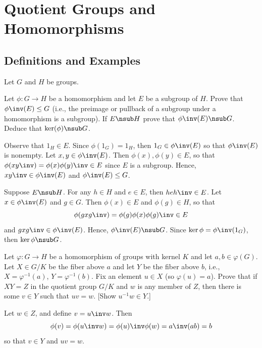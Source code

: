 \section{Quotient Groups and Homomorphisms}

\subsection{Definitions and Examples}

Let $G$ and $H$ be groups.

\begin{exercise}\label{ex3.1.1}
    Let $\phi : G \to H$ be a homomorphism and let $E$ be a subgroup of $H$. Prove that $\phi\inv(E) \leq G$ (i.e., the preimage or pullback of a subgroup under a homomorphism is a subgroup). If $E \nsub H$ prove that $\phi\inv(E) \nsub G$. Deduce that $\ker(\phi) \nsub G$.
\end{exercise}

\begin{sol}
    Observe that $1_H \in E$. Since $\phi(1_G) = 1_H$, then $1_G \in \phi\inv(E)$ so that $\phi\inv(E)$ is nonempty. Let $x, y \in \phi\inv(E)$. Then $\phi(x), \phi(y) \in E$, so that $\phi(xy\inv) = \phi(x)\phi(y)\inv \in E$ since $E$ is a subgroup. Hence, $xy\inv \in \phi\inv(E)$ and $\phi\inv(E) \leq G$.

    Suppose $E \nsub H$. For any $h \in H$ and $e \in E$, then $heh\inv \in E$. Let $x \in \phi\inv(E)$ and $g \in G$. Then $\phi(x) \in E$ and $\phi(g) \in H$, so that
    \[\phi(gxg\inv) = \phi(g)\phi(x)\phi(g)\inv \in E\]
    and $gxg\inv \in \phi\inv(E)$. Hence, $\phi\inv(E) \nsub G$. Since $\ker\phi = \phi\inv(1_G)$, then $\ker\phi \nsub G$.
\end{sol}

\begin{exercise}\label{ex3.1.2}
    Let $\varphi : G \to H$ be a homomorphism of groups with kernel $K$ and let $a,b \in \varphi(G)$. Let $X \in G/K$ be the fiber above $a$ and let $Y$ be the fiber above $b$, i.e., $X = \varphi^{-1}(a)$, $Y = \varphi^{-1}(b)$. Fix an element $u \in X$ (so $\varphi(u)=a$). Prove that if $XY = Z$ in the quotient group $G/K$ and $w$ is any member of $Z$, then there is some $v \in Y$ such that $uv = w$. [Show $u^{-1}w \in Y$.]
\end{exercise}

\begin{sol}
    Let $w \in Z$, and define $v = u\inv w$. Then
    \[\phi(v) = \phi(u\inv w) = \phi(u)\inv \phi(w) = a\inv (ab) = b\]
    so that $v \in Y$ and $uv = w$.
\end{sol}

